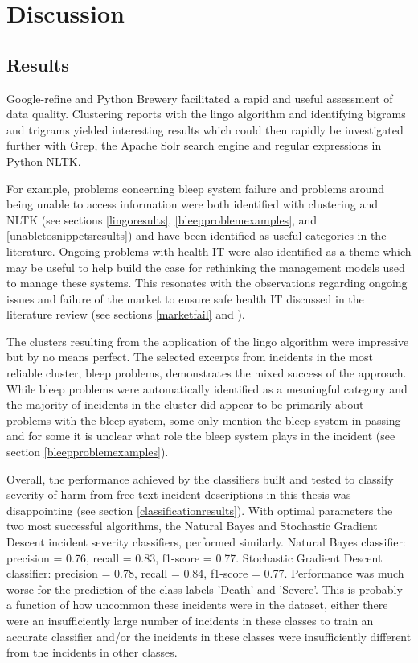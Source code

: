 \chapter{Discussion}

\section{Results}
Google-refine and Python Brewery facilitated a rapid and useful assessment of data quality. Clustering reports with the lingo algorithm and identifying bigrams and trigrams yielded interesting results which could then rapidly be investigated further with Grep, the Apache Solr search engine and regular expressions in Python NLTK.

For example, problems concerning bleep system failure and problems around being unable to access information were both identified with clustering and NLTK (see sections \ref{lingoresults}, \ref{bleepproblemexamples}, and \ref{unabletosnippetsresults}) and have been identified as useful categories in the literature.\cite{Magrabi2012} Ongoing problems with health IT were also identified as a theme which may be useful to help build the case for rethinking the management models used to manage these systems. This resonates with the observations regarding ongoing issues and failure of the market to ensure safe health IT discussed in the literature review (see sections \ref{marketfail} and \label{intractable}).

The clusters resulting from the application of the lingo algorithm were impressive but by no means perfect. The selected excerpts from incidents in the most reliable cluster, bleep problems, demonstrates the mixed success of the approach. While bleep problems were automatically identified as a meaningful category and the majority of incidents in the cluster did appear to be primarily about problems with the bleep system, some only mention the bleep system in passing and for some it is unclear what role the bleep system plays in the incident (see section \ref{bleepproblemexamples}).

Overall, the performance achieved by the classifiers built and tested to classify severity of harm from free text incident descriptions in this thesis was disappointing (see section \ref{classificationresults}). With optimal parameters the two most successful algorithms, the Natural Bayes and Stochastic Gradient Descent incident severity classifiers, performed similarly. Natural Bayes classifier: precision =  0.76, recall = 0.83, f1-score = 0.77. Stochastic Gradient Descent classifier: precision = 0.78, recall = 0.84, f1-score = 0.77. Performance was much worse for the prediction of the class labels 'Death' and 'Severe'. This is probably a function of how uncommon these incidents were in the dataset, either there were an insufficiently large number of incidents in these classes to train an accurate classifier and/or the incidents in these classes were insufficiently different from the incidents in other classes. 

